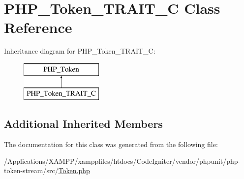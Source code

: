 \hypertarget{class_p_h_p___token___t_r_a_i_t___c}{}\section{P\+H\+P\+\_\+\+Token\+\_\+\+T\+R\+A\+I\+T\+\_\+C Class Reference}
\label{class_p_h_p___token___t_r_a_i_t___c}
Inheritance diagram for P\+H\+P\+\_\+\+Token\+\_\+\+T\+R\+A\+I\+T\+\_\+C\+:\begin{figure}[H]
\begin{center}
\leavevmode
\includegraphics[height=2.000000cm]{class_p_h_p___token___t_r_a_i_t___c}
\end{center}
\end{figure}
\subsection*{Additional Inherited Members}


The documentation for this class was generated from the following file\+:\begin{DoxyCompactItemize}
\item 
/\+Applications/\+X\+A\+M\+P\+P/xamppfiles/htdocs/\+Code\+Igniter/vendor/phpunit/php-\/token-\/stream/src/\mbox{\hyperlink{_token_8php}{Token.\+php}}\end{DoxyCompactItemize}
